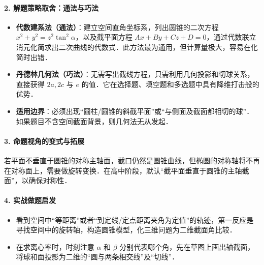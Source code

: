 \documentclass[11pt,a4paper]{ctexart}
\begin{document}
\paragraph*{2. 解题策略取舍：通法与巧法}
\begin{itemize}[itemsep=0.2em]
  \item \textbf{代数建系法（通法）}：建立空间直角坐标系，列出圆锥的二次方程 $x^2 + y^2 = z^2 \tan^2\alpha$，以及截平面方程 $Ax + By + Cz + D = 0$，通过代数联立消元化简求出二次曲线的代数式．此方法最为通用，但计算量极大，容易在化简时出错．
  \item \textbf{丹德林几何法（巧法）}：无需写出截线方程，只需利用几何投影和切球关系，直接获得 $2a, 2c$ 与 $e$ 的值．它在选择题、填空题和多选题中具有降维打击般的优势．
  \item \textbf{适用边界}：必须出现“圆柱/圆锥的斜截平面”或“与侧面及截面都相切的球”．如果题目不含空间截面背景，则几何法无从发起．
\end{itemize}

\paragraph*{3. 命题视角的变式与拓展}
若平面不垂直于圆锥的对称主轴面，截口仍然是圆锥曲线，但椭圆的对称轴将不再在对称面上，需要做旋转变换．在高中阶段，默认“截平面垂直于圆锥的主轴截面”，以确保对称性．

\paragraph*{4. 实战做题启发}
\begin{itemize}[itemsep=0.2em]
  \item 看到空间中“等距离”或者“到定线/定点距离夹角为定值”的轨迹，第一反应是寻找空间中的旋转轴，构造圆锥模型，化三维问题为二维截面角比较．
  \item 在求离心率时，时刻注意 $\alpha$ 和 $\beta$ 分别代表哪个角，先在草图上画出轴截面，将球和面投影为二维的“圆与两条相交线”及“切线”．
\end{itemize}

\end{document}
